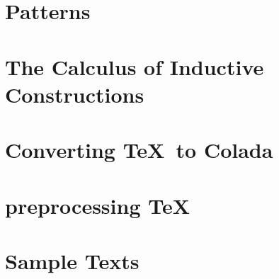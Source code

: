 \section{Patterns}


\section{The Calculus of Inductive Constructions}


\section{Converting \TeX\ to Colada}

\section{preprocessing \TeX}

\section{Sample Texts}

